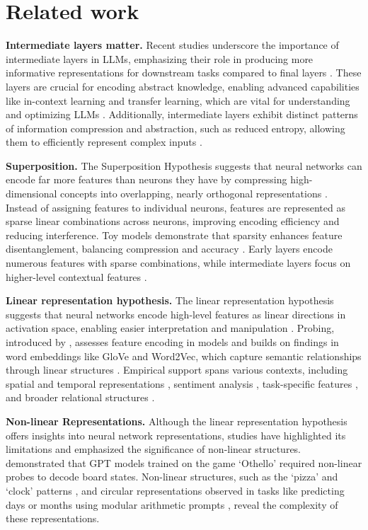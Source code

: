 \section{Related work}
\label{sec:related work} 

\textbf{Intermediate layers matter.}
Recent studies underscore the importance of intermediate layers in LLMs, emphasizing their role in producing more informative representations for downstream tasks compared to final layers \cite{kavehzadeh2024sorted, ju2024large, liu2024fantastic, skean2024does}. These layers are crucial for encoding abstract knowledge, enabling advanced capabilities like in-context learning and transfer learning, which are vital for understanding and optimizing LLMs \cite{zhang-etal-2024-investigating}. Additionally, intermediate layers exhibit distinct patterns of information compression and abstraction, such as reduced entropy, allowing them to efficiently represent complex inputs \cite{doimo2024representation, yin2024entropy}.

\textbf{Superposition.}
The Superposition Hypothesis suggests that neural networks can encode far more features than neurons they have by compressing high-dimensional concepts into overlapping, nearly orthogonal representations \cite{arora2018linear, scherlis2022polysemanticity, jermyn2022engineering}. Instead of assigning features to individual neurons, features are represented as sparse linear combinations across neurons, improving encoding efficiency and reducing interference. Toy models demonstrate that sparsity enhances feature disentanglement, balancing compression and accuracy \cite{elhage2022toy}. Early layers encode numerous features with sparse combinations, while intermediate layers focus on higher-level contextual features \cite{gurnee2023finding}.  

\textbf{Linear representation hypothesis.} The linear representation hypothesis suggests that neural networks encode high-level features as linear directions in activation space, enabling easier interpretation and manipulation \cite{nanda2023b}. Probing, introduced by \cite{alain2016understanding}, assesses feature encoding in models and builds on findings in word embeddings like GloVe and Word2Vec, which capture semantic relationships through linear structures \cite{mikolov2013, pennington2014}. Empirical support spans various contexts, including spatial and temporal representations \cite{gurnee2023language}, sentiment analysis \cite{tigges2023linear}, task-specific features \cite{hendel2023context}, and broader relational structures \cite{hernandez2023linearity}.

\textbf{Non-linear Representations.} Although the linear representation hypothesis offers insights into neural network representations, studies have highlighted its limitations and emphasized the significance of non-linear structures. \cite{li2022emergent} demonstrated that GPT models trained on the game `Othello' required non-linear probes to decode board states. Non-linear structures, such as the `pizza' and `clock' patterns \cite{nanda2023progress, zhong2024clock}, and circular representations observed in tasks like predicting days or months using modular arithmetic prompts \cite{engels2024not}, reveal the complexity of these representations.